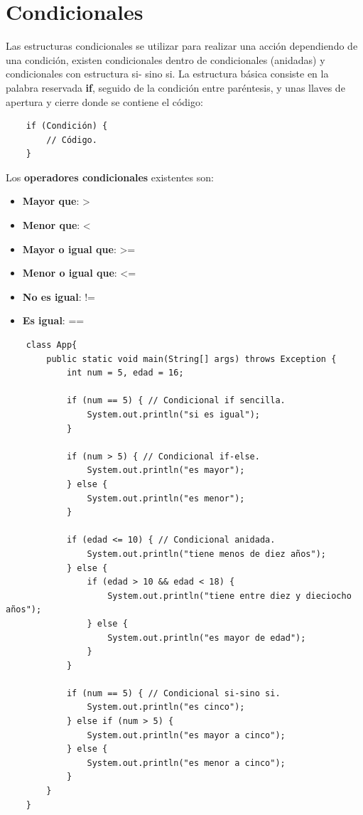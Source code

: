 \section{Condicionales}
\hspace{0.55cm}Las estructuras condicionales se utilizar para realizar una acción dependiendo de una condición, existen condicionales dentro de condicionales (anidadas) y condicionales con estructura si- sino si. La estructura básica consiste en la palabra reservada \textbf{if}, seguido de la condición entre paréntesis, y unas llaves de apertura y cierre donde se contiene el código:
\begin{lstlisting}
    if (Condición) {
        // Código.
    }
\end{lstlisting}

Los \textbf{operadores condicionales} existentes son:
\begin{itemize}
    \item \textbf{Mayor que}: >
    \item \textbf{Menor que}: <
    \item \textbf{Mayor o igual que}: >=
    \item \textbf{Menor o igual que}: <=
    \item \textbf{No es igual}: !=
    \item \textbf{Es igual}: ==
\end{itemize}
\begin{lstlisting}
    class App{
        public static void main(String[] args) throws Exception {
            int num = 5, edad = 16;
            
            if (num == 5) { // Condicional if sencilla.
                System.out.println("si es igual");
            }
            
            if (num > 5) { // Condicional if-else.
                System.out.println("es mayor");
            } else {
                System.out.println("es menor");
            }
            
            if (edad <= 10) { // Condicional anidada.
                System.out.println("tiene menos de diez años");
            } else {
                if (edad > 10 && edad < 18) {
                    System.out.println("tiene entre diez y dieciocho años");
                } else {
                    System.out.println("es mayor de edad");
                }
            }
            
            if (num == 5) { // Condicional si-sino si.
                System.out.println("es cinco");
            } else if (num > 5) {
                System.out.println("es mayor a cinco");
            } else {
                System.out.println("es menor a cinco");
            }
        }
    }
\end{lstlisting}



